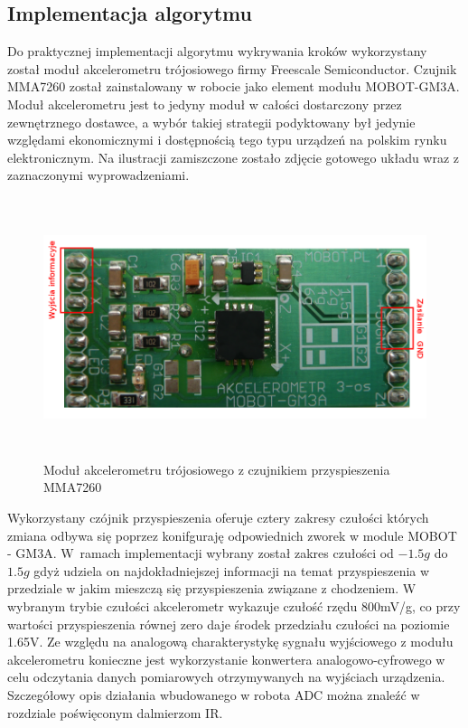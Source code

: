\subsection{Implementacja algorytmu}
Do praktycznej implementacji algorytmu wykrywania kroków wykorzystany został
moduł akcelerometru trójosiowego firmy Freescale Semiconductor. Czujnik 
MMA7260\cite{MMA7260DataSheet} został zainstalowany w robocie jako element
modułu MOBOT-GM3A. Moduł akcelerometru jest to jedyny moduł w całości
dostarczony przez zewnętrznego dostawce, a wybór takiej strategii podyktowany
był jedynie względami ekonomicznymi i dostępnością tego typu urządzeń na polskim
rynku elektronicznym. Na ilustracji zamiszczone zostało zdjęcie gotowego układu
wraz z zaznaczonymi wyprowadzeniami.

\begin{figure}[h!]
 \centering
 \includegraphics[height=76mm]{../images/ch04/gm3a_view.png}
 \caption{Moduł akcelerometru trójosiowego z czujnikiem przyspieszenia MMA7260}
 \label{fig:AccView}
\end{figure}

Wykorzystany czójnik przyspieszenia oferuje cztery zakresy czułości których
zmiana odbywa się poprzez konifguraję odpowiednich zworek w module MOBOT - GM3A.
W~ramach implementacji wybrany został zakres czułości od $-1.5g$ do $1.5g$ gdyż
udziela on najdokładniejszej informacji na temat przyspieszenia w przedziale w
jakim mieszczą się przyspieszenia związane z chodzeniem. W wybranym trybie
czułości akcelerometr wykazuje czułość rzędu 800mV/g, co przy wartości
przyspieszenia równej zero daje środek przedziału czułości na poziomie 1.65V.
Ze względu na analogową charakterystykę sygnału wyjściowego z modułu
akcelerometru konieczne jest wykorzystanie konwertera analogowo-cyfrowego w
celu odczytania danych pomiarowych otrzymywanych na wyjściach urządzenia.
Szczegółowy opis działania wbudowanego w robota ADC można znaleźć w rozdziale
poświęconym dalmierzom IR. 

